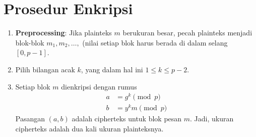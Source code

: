 \documentclass{article}
\begin{document}

\section*{Prosedur Enkripsi}

\begin{enumerate}
    \item \textbf{Preprocessing}: Jika plainteks $m$ berukuran besar, pecah plainteks menjadi blok-blok $m_1, m_2, \dots,$ (nilai setiap blok harus berada di dalam selang $[0, p - 1]$.
    \item Pilih bilangan acak $k$, yang dalam hal ini $1 \le k \le p - 2$.
    \item Setiap blok $m$ dienkripsi dengan rumus
    \begin{align}
        a &= g^k \pmod{p} \tag{2} \\
        b &= y^k m \pmod{p} \tag{3}
    \end{align}
    Pasangan $(a, b)$ adalah cipherteks untuk blok pesan $m$. Jadi, ukuran cipherteks adalah dua kali ukuran plainteksnya.
\end{enumerate}
\end{document}
